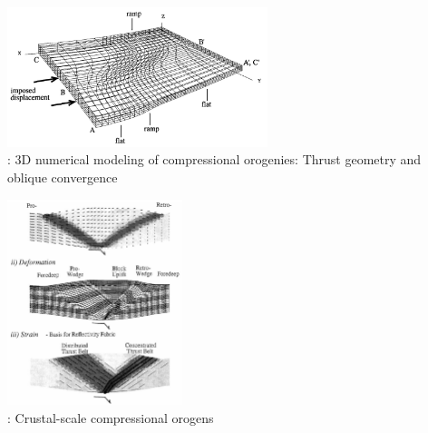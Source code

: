 \begin{center}
\begin{minipage}{0.45\textwidth}
\centering
\includegraphics[width=7.6cm]{images/history/brau93}\\
{: 3D numerical modeling of
compressional orogenies: Thrust geometry and
oblique convergence \cite{brau93}}
\end{minipage}\hfill
\begin{minipage}{0.45\textwidth}
\centering
\includegraphics[height=6cm]{images/history/bequ94}\\
{: Crustal-scale compressional orogens \cite{bequ94}}
\end{minipage}
\end{center}

